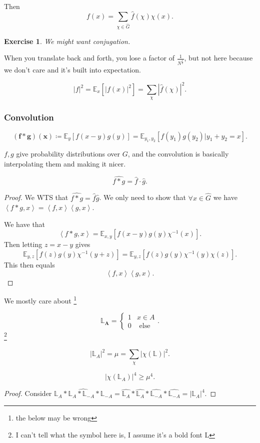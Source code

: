 \documentclass[a4paper]{article}
\newtheorem{exercise}{Exercise}[section]
\begin{document}
Then
\[
	f(x) = \sum_{\chi \in \hat{G} } \hat{f}(\chi)\chi(x)
.\]

\begin{exercise}
	We might want conjugation.
\end{exercise}

When you translate back and forth, you lose a factor of $\frac{1}{N^{\frac{1}{2}} } $, but not here because we don't care and it's built into expectation.

\begin{thm}
	\[
		|f|^2 = \mathbb{E}_x[|f(x)|^2] = \sum_{\chi} |\hat{f}(\chi )|^2
	.\]
\end{thm}

\subsubsection{Convolution}

\begin{definition}
	\[
		\bm{(f\ast g)(x)} \coloneqq \mathbb{E}_y[f(x-y)g(y)] = \mathbb{E}_{y_{1},y_{2}}[f(y_{1})g(y_{2})|y_{1}+y_{2}=x]
	.\]
\end{definition}

$f,g $ give probability distributions over $G $, and the convolution is basically interpolating them and making it nicer.

\begin{prop}
	\[
		\hat{f\ast g} = \hat{f}\cdot \hat{g}
	.\]
\end{prop}
\begin{proof}
	We WTS that $\widehat{f\ast g} = \hat{f}\hat{g}    $.
	We only need to show that $\forall x\in \hat{G}  $ we have $\left< f\ast g,x \right> = \left< f,x \right>\left< g,x \right> $.

	We have that
	\[
		\left< f\ast g,x \right> = \mathbb{E}_{x,y}[f(x-y)g(y)\chi ^{-1}(x)]
	.\]
	Then letting $z = x-y $ gives
	\[
		\mathbb{E}_{y,z}[f(z)g(y)\chi ^{-1}(y+z)] = \mathbb{E}_{y,z}[f(z)g(y)\chi ^{-1}(y)\chi (z)]
	.\]
	This then equals
	\[
		\left< f,x \right>\left< g,x \right>
	.\]
\end{proof}

We mostly care about \footnote{the below may be wrong}
\begin{definition}
\[
	\bm{\mathbb{L}_A} =
	\begin{cases}
		1 & x\in A\\
		0 & \text{ else}
	\end{cases}
.\]
\footnote{I can't tell what the symbol here is, I assume it's a bold font L}
\end{definition}

\begin{thm}
	\[
		|\mathbb{L}_A|^2 = \mu = \sum_{\chi} |\chi(\mathbb{L})|^2
	.\]
\end{thm}

\begin{lem}
	\[
		|\chi(\mathbb{L}_A)|^4 \ge \mu^4
	.\]
\end{lem}
\begin{proof}
	Consider $\widehat{\mathbb{L}_A\ast \mathbb{L}_{A}\ast \mathbb{L}_{-A}\ast\mathbb{L}_{-A}} = \hat{\mathbb{L}_A}\ast \hat{\mathbb{L}_A}\ast \hat{\mathbb{L}_{-A}}\ast \hat{\mathbb{L}_{-A}} = |\mathbb{L}_A|^{4} $.
\end{proof}
\end{document}
